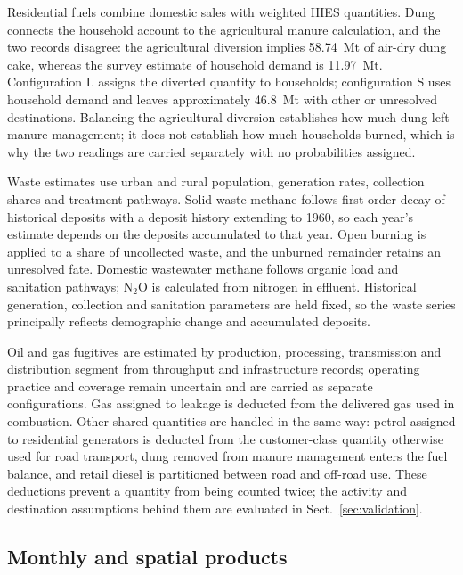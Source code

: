 \documentclass[essd,manuscript]{copernicus}
\begin{document}
Residential fuels combine domestic sales with weighted HIES quantities. Dung connects the household account to the agricultural manure calculation, and the two records disagree: the agricultural diversion implies \SI{58.74}{\mega\tonne} of air-dry dung cake, whereas the survey estimate of household demand is \SI{11.97}{\mega\tonne}. Configuration L assigns the diverted quantity to households; configuration S uses household demand and leaves approximately \SI{46.8}{\mega\tonne} with other or unresolved destinations. Balancing the agricultural diversion establishes how much dung left manure management; it does not establish how much households burned, which is why the two readings are carried separately with no probabilities assigned.

Waste estimates use urban and rural population, generation rates, collection shares and treatment pathways. Solid-waste methane follows first-order decay of historical deposits with a deposit history extending to 1960, so each year's estimate depends on the deposits accumulated to that year. Open burning is applied to a share of uncollected waste, and the unburned remainder retains an unresolved fate. Domestic wastewater methane follows organic load and sanitation pathways; N$_2$O is calculated from nitrogen in effluent. Historical generation, collection and sanitation parameters are held fixed, so the waste series principally reflects demographic change and accumulated deposits.

Oil and gas fugitives are estimated by production, processing, transmission and distribution segment from throughput and infrastructure records; operating practice and coverage remain uncertain and are carried as separate configurations. Gas assigned to leakage is deducted from the delivered gas used in combustion. Other shared quantities are handled in the same way: petrol assigned to residential generators is deducted from the customer-class quantity otherwise used for road transport, dung removed from manure management enters the fuel balance, and retail diesel is partitioned between road and off-road use. These deductions prevent a quantity from being counted twice; the activity and destination assumptions behind them are evaluated in Sect.~\ref{sec:validation}.

\subsection{Monthly and spatial products}
\label{sec:allocation}
\end{document}
